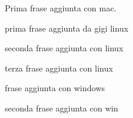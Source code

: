 \documentclass[a4paper]{article}
\begin{document}
Prima frase aggiunta con mac.

prima frase aggiunta da gigi linux

seconda frase aggiunta con linux

terza frase aggiunta con linux

frase aggiunta con windows

seconda frase aggiunta con win
\end{document}
